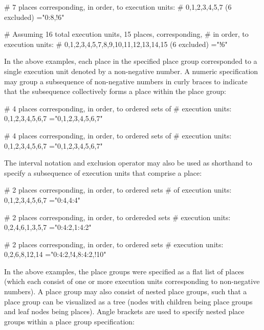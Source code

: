 \begin{boxeducode}
# 7 places corresponding, in order, to execution units:
# 0,1,2,3,4,5,7 (6 excluded)
="0:8,!6"

# Assuming 16 total execution units, 15 places, corresponding,
# in order, to execution units:
# 0,1,2,3,4,5,7,8,9,10,11,12,13,14,15 (6 excluded)
="!6"
\end{boxeducode}

In the above examples, each place in the specified place group corresponded to a
single execution unit denoted by a non-negative number. A numeric specification
may group a subsequence of non-negative numbers in curly braces to indicate that
the subsequence collectively forms a place within the place group:

\begin{boxeducode}
# 4 places corresponding, in order, to ordered sets of
# execution units: {0,1},{2,3},{4,5},{6,7}
="{0,1},{2,3},{4,5},{6,7}"

# 4 places corresponding, in order, to ordered sets of
# execution units: {0},{1},{2,3,4},{5,6,7}
="0,1,{2,3,4},{5,6,7}"
\end{boxeducode}

The interval notation and exclusion operator may also be used as shorthand to
specify a subsequence of execution units that comprise a place:

\begin{boxeducode}
# 2 places corresponding, in order, to ordered sets
# of execution units: {0,1,2,3},{4,5,6,7}
="{0:4},{4:4}"

# 2 places corresponding, in order, to ordereded sets
# execution units: {0,2,4,6},{1,3,5,7}
="{0:4:2},{1:4:2}"

# 2 places corresponding, in order, to ordered sets
# execution units: {0,2,6},{8,12,14}
="{0:4:2,!4},{8:4:2,!10}"
\end{boxeducode}

In the above examples, the place groups were specified as a flat list of places
(which each consist of one or more execution units corresponding to non-negative
numbers). A place group may also consist of nested place groups, such that a
place group can be visualized as a tree (nodes with children being place groups
and leaf nodes being places). Angle brackets are used to specify nested place
groups within a place group specification:

